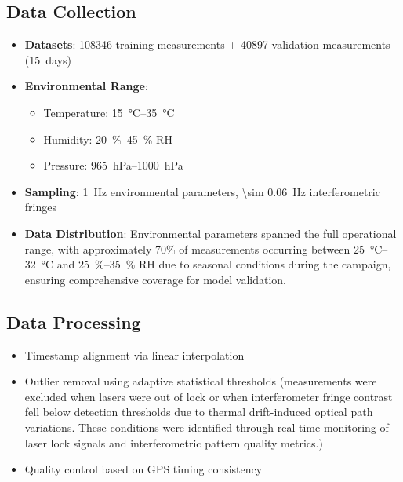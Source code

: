\documentclass[aip,reprint,groupedaddress,onecolumn,superscriptaddress]{revtex4-2}
\begin{document}
\subsection{Data Collection}
\begin{itemize}
    \item \textbf{Datasets}: \num{108346} training measurements + \num{40897} validation measurements (\SI{15}{days})
    \item \textbf{Environmental Range}:
    \begin{itemize}
        \item Temperature: \SIrange{15}{35}{\degreeCelsius}
        \item Humidity: \SIrange{20}{45}{\percent} RH
        \item Pressure: \SIrange{965}{1000}{\hecto\pascal}
    \end{itemize}
    \item \textbf{Sampling}: \SI{1}{\hertz} environmental parameters, \SI{\sim 0.06}{\hertz} interferometric fringes
    \item \textbf{Data Distribution}: Environmental parameters spanned the full operational range, with approximately 70\% of measurements occurring between \SIrange{25}{32}{\degreeCelsius} and \SIrange{25}{35}{\percent} RH due to seasonal conditions during the campaign, ensuring comprehensive coverage for model validation.
\end{itemize}

\subsection{Data Processing}
\begin{itemize}
    \item Timestamp alignment via linear interpolation
    \item Outlier removal using adaptive statistical thresholds (measurements were excluded when lasers were out of lock or when interferometer fringe contrast fell below detection thresholds due to thermal drift-induced optical path variations. These conditions were identified through real-time monitoring of laser lock signals and interferometric pattern quality metrics.) 
    \item Quality control based on GPS timing consistency
\end{itemize}
\end{document}
